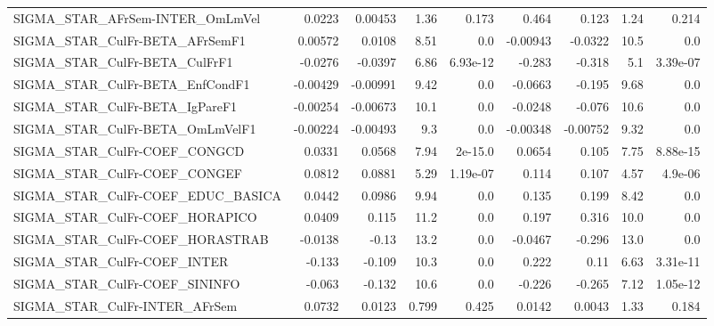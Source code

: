 \begin{tabular}{lrrrrrrrr}
SIGMA\_STAR\_AFrSem-INTER\_OmLmVel       &      0.0223 &      0.00453 &    1.36 &    0.173 &      0.464 &       0.123 &         1.24 &         0.214 \\
SIGMA\_STAR\_CulFr-BETA\_AFrSemF1        &     0.00572 &       0.0108 &    8.51 &      0.0 &   -0.00943 &     -0.0322 &         10.5 &           0.0 \\
SIGMA\_STAR\_CulFr-BETA\_CulFrF1         &     -0.0276 &      -0.0397 &    6.86 & 6.93e-12 &     -0.283 &      -0.318 &          5.1 &      3.39e-07 \\
SIGMA\_STAR\_CulFr-BETA\_EnfCondF1       &    -0.00429 &     -0.00991 &    9.42 &      0.0 &    -0.0663 &      -0.195 &         9.68 &           0.0 \\
SIGMA\_STAR\_CulFr-BETA\_IgPareF1        &    -0.00254 &     -0.00673 &    10.1 &      0.0 &    -0.0248 &      -0.076 &         10.6 &           0.0 \\
SIGMA\_STAR\_CulFr-BETA\_OmLmVelF1       &    -0.00224 &     -0.00493 &     9.3 &      0.0 &   -0.00348 &    -0.00752 &         9.32 &           0.0 \\
SIGMA\_STAR\_CulFr-COEF\_CONGCD          &      0.0331 &       0.0568 &    7.94 &  2e-15.0 &     0.0654 &       0.105 &         7.75 &      8.88e-15 \\
SIGMA\_STAR\_CulFr-COEF\_CONGEF          &      0.0812 &       0.0881 &    5.29 & 1.19e-07 &      0.114 &       0.107 &         4.57 &       4.9e-06 \\
SIGMA\_STAR\_CulFr-COEF\_EDUC\_BASICA     &      0.0442 &       0.0986 &    9.94 &      0.0 &      0.135 &       0.199 &         8.42 &           0.0 \\
SIGMA\_STAR\_CulFr-COEF\_HORAPICO        &      0.0409 &        0.115 &    11.2 &      0.0 &      0.197 &       0.316 &         10.0 &           0.0 \\
SIGMA\_STAR\_CulFr-COEF\_HORASTRAB       &     -0.0138 &        -0.13 &    13.2 &      0.0 &    -0.0467 &      -0.296 &         13.0 &           0.0 \\
SIGMA\_STAR\_CulFr-COEF\_INTER           &      -0.133 &       -0.109 &    10.3 &      0.0 &      0.222 &        0.11 &         6.63 &      3.31e-11 \\
SIGMA\_STAR\_CulFr-COEF\_SININFO         &      -0.063 &       -0.132 &    10.6 &      0.0 &     -0.226 &      -0.265 &         7.12 &      1.05e-12 \\
SIGMA\_STAR\_CulFr-INTER\_AFrSem         &      0.0732 &       0.0123 &   0.799 &    0.425 &     0.0142 &      0.0043 &         1.33 &         0.184 \\

\end{tabular}
